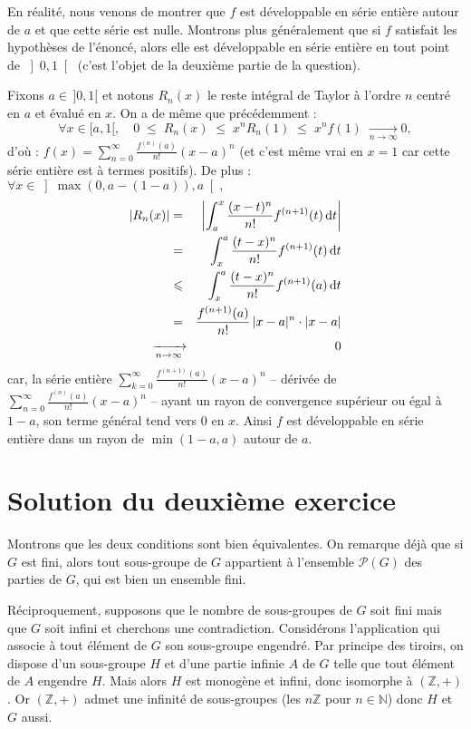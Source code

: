 En réalité, nous venons de montrer que $f$ est développable en série entière autour de $a$ et que cette série est nulle. Montrons plus généralement que si $f$ satisfait les hypothèses de l'énoncé, alors elle est développable en série entière en tout point de $\left]0,1\right[$ (c'est l'objet de la deuxième partie de la question).

Fixons $a\in \,]0,1[$ et notons $R_{n} (x)$ le reste intégral de Taylor à l'ordre $n$ centré en $a$ et évalué en $x$. On a de même que précédemment : 
\[
\forall x\in [a,1[,\quad
0 \;\leqslant \; R_{n} (x) 
\;\leqslant \;
 x^{n} R_{n} (1)
 \;\leqslant \;
 x^{n} f(1) \;
 \xrightarrow[n\rightarrow\infty]{} 0,
\]
d'où : $f(x)=\displaystyle \sum _{n=0} ^{\infty } \frac{f^{(n)}(a)}{n!} (x-a)^{n}$ (et c'est même vrai en $x=1$ car cette série entière est à termes positifs).
%
De plus : $\forall x\in \left]\max (0,a-(1-a)),a\right[,$
\begin{eqnarray*}
|R_{n} (x)| &=& \left| \int _{a} ^{x} \frac{(x-t)^{n} }{n!} f^{(n+1)}(t) \,\mathrm{d}t \right|\\
&=& \int _{x} ^{a} \frac{(t-x)^{n} }{n!} f^{(n+1)}(t) \,\mathrm{d}t\\
&\leqslant & \int _{x} ^{a} \frac{(t-x)^{n} }{n!} f^{(n+1)}(a) \,\mathrm{d}t\\
&=& \frac{f^{(n+1)}(a)}{n!} \, |x-a|^{n} \cdot  |x-a| \\
&\text{\makebox[0mm]{$\xrightarrow[n\rightarrow\infty]{}$}} & \ \ 0
\end{eqnarray*}
car, la série entière $\displaystyle \sum _{k=0} ^{\infty } \frac{f^{(n+1)}(a)}{n!} (x-a)^{n}$ -- dérivée de $\displaystyle \sum _{n=0} ^{\infty } \frac{f^{(n)}(a)}{n!} (x-a)^{n}$ -- ayant un rayon de convergence supérieur ou égal à $1-a$, son terme général tend vers 0 en $x$. Ainsi $f$ est développable en série entière dans un rayon de $\min(1-a,a)$ autour de $a$.


\section{Solution du deuxième exercice} %

Montrons que les deux conditions sont bien équivalentes. On remarque déjà que si 
$G$ est fini, alors tout sous-groupe de $G$ appartient à l'ensemble $\mathscr P(G)$ des parties de $G$, qui est bien un ensemble fini.

Réciproquement, supposons que le nombre de sous-groupes de $G$ soit fini mais que $G$ soit infini et cherchons une contradiction. Considérons l'application qui associe à tout élément de $G$ son sous-groupe engendré.
Par principe des tiroirs, on dispose d'un sous-groupe $H$ et d'une partie infinie $A$ de $G$ telle que tout élément de $A$ engendre $H$.
Mais alors $H$ est monogène et infini, donc isomorphe à $(\mathbb Z,+)$. Or $(\mathbb Z,+)$ admet une infinité de sous-groupes (les $n\mathbb Z$ pour $n \in \mathbb N$) donc $H$ et $G$ aussi.
